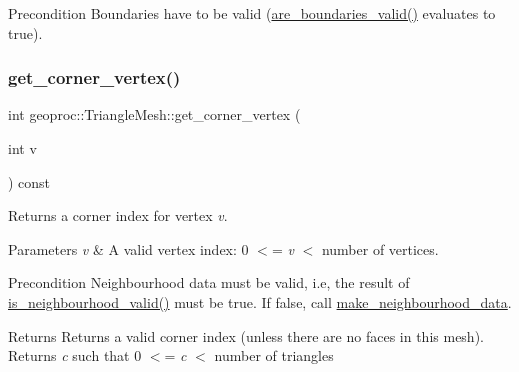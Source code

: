 \begin{DoxyPrecond}{Precondition}
Boundaries have to be valid (\hyperlink{classgeoproc_1_1TriangleMesh_a409e399857e1a1abc9f23918ff5f5860}{are\+\_\+boundaries\+\_\+valid()} evaluates to true). 
\end{DoxyPrecond}
\mbox{\label{classgeoproc_1_1TriangleMesh_a1a9e75bf79d26456527f943c653f31ab}} 
\subsubsection{\texorpdfstring{get\+\_\+corner\+\_\+vertex()}{get\_corner\_vertex()}}
{\footnotesize\ttfamily int geoproc\+::\+Triangle\+Mesh\+::get\+\_\+corner\+\_\+vertex (\begin{DoxyParamCaption}\item[{int}]{v }\end{DoxyParamCaption}) const}



Returns a corner index for vertex {\itshape v}. 


\begin{DoxyParams}{Parameters}
{\em v} & A valid vertex index\+: 0 $<$= {\itshape v} $<$ number of vertices. \\
\hline
\end{DoxyParams}
\begin{DoxyPrecond}{Precondition}
Neighbourhood data must be valid, i.\+e, the result of \hyperlink{classgeoproc_1_1TriangleMesh_aa6f95b95709a72a14a15638bfeeed3f9}{is\+\_\+neighbourhood\+\_\+valid()} must be true. If false, call \hyperlink{classgeoproc_1_1TriangleMesh_a84003dfdfd5e591c00f01a797578ff1f}{make\+\_\+neighbourhood\+\_\+data}. 
\end{DoxyPrecond}
\begin{DoxyReturn}{Returns}
Returns a valid corner index (unless there are no faces in this mesh). Returns {\itshape c} such that 0 $<$= {\itshape c} $<$ number of triangles 
\end{DoxyReturn}
\mbox{\label{classgeoproc_1_1TriangleMesh_acd89c54ec14ddfb5d38f1baedb717fc2}} 
